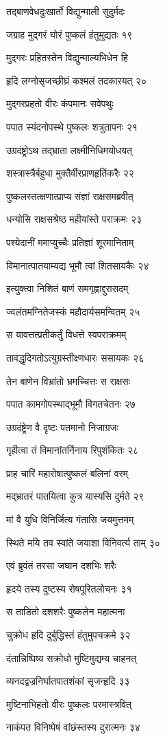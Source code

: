 तद्बाणवेधदुःखार्तो विद्युन्माली सुदुर्मदः

जग्राह मुद्गरं घोरं पुष्कलं हंतुमुद्यतः १९

मुद्गरः प्रहितस्तेन विद्युन्माल्यभिधेन हि

हृदि लग्नोसृजच्छीघ्रं कश्मलं तदकारयत् २०

मुद्गरप्रहतो वीरः कंपमानः सवेपथुः

पपात स्यंदनोपस्थे पुष्कलः शत्रुतापनः २१

उग्रदंष्ट्रोऽथ तद्भ्राता लक्ष्मीनिधिमयोधयत्

शस्त्रास्त्रैर्बहुधा मुक्तैर्वीरप्राणहृतिंकरैः २२

पुष्कलस्तत्क्षणात्प्राप्य संज्ञां राक्षसमब्रवीत्

धन्योसि राक्षसश्रेष्ठ महीयांस्ते पराक्रमः २३

पश्येदानीं ममाप्युच्चैः प्रतिज्ञां शूरमानिताम्

विमानात्पातयाम्यद्य भूमौ त्वां शितसायकैः २४

इत्युक्त्वा निशितं बाणं समगृह्णाद्दुरासदम्

ज्वलंतमग्नितेजस्कं महौदार्यसमन्वितम् २५

स यावत्तत्प्रतीकर्तुं विधत्ते स्वपराक्रमम्

तावद्धृदिगतोऽत्युग्रस्तीक्ष्णधारः ससायकः २६

तेन बाणेन विभ्रांतो भ्रमच्चित्तः स राक्षसः

पपात कामगोपस्थाद्भूमौ विगतचेतनः २७

उग्रदंष्ट्रेण वै दृष्टः पतमानो निजाग्रजः

गृहीत्वा तं विमानांतर्निनाय रिपुशंकितः २८

प्राह चारिं महारोषात्पुष्कलं बलिनां वरम्

मद्भ्रातरं पातयित्वा कुत्र यास्यसि दुर्मते २९

मां वै युधि विनिर्जित्य गंतासि जयमुत्तमम्

स्थिते मयि तव स्वांते जयाशा विनिवर्त्य ताम् ३०

एवं ब्रुवंतं तरसा जघान दशभिः शरैः

हृदये तस्य दुष्टस्य रोषपूरितलोचनः ३१

स ताडितो दशशरैः पुष्कलेन महात्मना

चुक्रोध हृदि दुर्बुद्धिस्तं हंतुमुपचक्रमे ३२

दंतान्निष्पिष्य सक्रोधो मुष्टिमुद्यम्य चाहनत्

व्यनदद्वज्रनिर्घातपातशंकां सृजन्हृदि ३३

मुष्टिनाभिहतो वीरः पुष्कलः परमास्त्रवित्

नाकंपत विनिष्पेषं वांछंस्तस्य दुरात्मनः ३४

